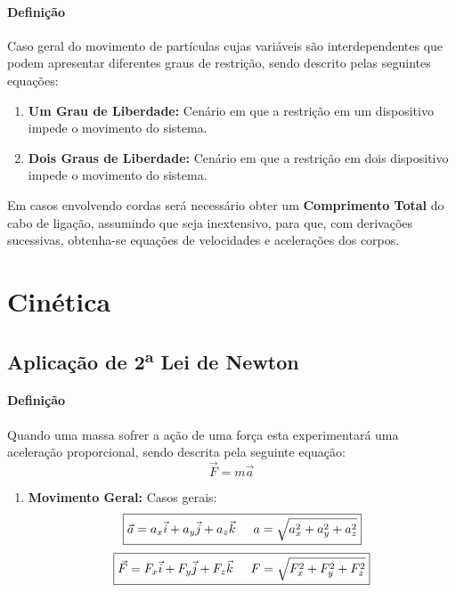 \documentclass{article}
\begin{document}
            \paragraph{Definição}Caso geral do movimento de partículas cujas variáveis são interdependentes que podem apresentar diferentes graus de restrição, sendo descrito pelas seguintes equações:
                \begin{enumerate}[noitemsep]
                    \item \textbf{Um Grau de Liberdade:} Cenário em que a restrição em um dispositivo impede o movimento do sistema.
                    \item \textbf{Dois Graus de Liberdade:} Cenário em que a restrição em dois dispositivo impede o movimento do sistema.
                \end{enumerate}
            Em casos envolvendo cordas será necessário obter um \textbf{Comprimento Total} do cabo de ligação, assumindo que seja inextensivo, para que, com derivações sucessivas, obtenha-se equações de velocidades e acelerações dos corpos.
\newpage

    \section{Cinética}
        \subsection{Aplicação de 2\textsuperscript{a} Lei de Newton}
            \paragraph{Definição}Quando uma massa sofrer a ação de uma força esta experimentará uma aceleração proporcional, sendo descrita pela seguinte equação:
                \begin{equation}
                    \boxed{
                        \vec{F} = m\vec{a}
                    }
                \end{equation}
                \begin{enumerate}[noitemsep]
                    \item \textbf{Movimento Geral:} Casos gerais:
                        \begin{equation}
                            \boxed{
                                \vec{a} = a_{x}\vec{i} + a_{y}\vec{j} + a_{z}\vec{k}
                                \hspace{5mm}
                                a = \sqrt{a_{x}^2 + a_{y}^2 + a_{z}^2}
                            }
                        \end{equation}
                        \begin{equation}
                            \boxed{
                                \vec{F} = F_{x}\vec{i} + F_{y}\vec{j} + F_{z}\vec{k}
                                \hspace{5mm}
                                F = \sqrt{F_{x}^2 + F_{y}^2 + F_{z}^2}
                            }
                        \end{equation}
                \end{enumerate}
\end{document}

